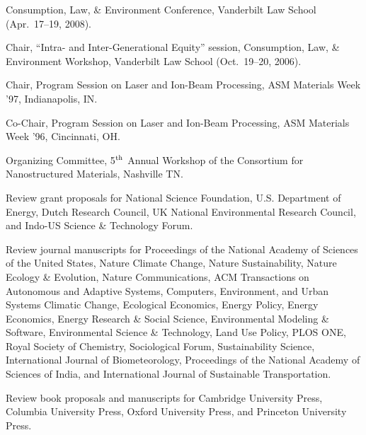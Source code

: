   Consumption, Law, \& Environment Conference, Vanderbilt Law School
  (Apr.\ 17--19, 2008).
\item[2006] Chair, ``Intra- and Inter-Generational Equity'' session,
  Consumption, Law, \& Environment Workshop, Vanderbilt Law School
  (Oct.~19--20, 2006).
\item[1997] Chair, Program Session on Laser and Ion-Beam Processing,
  ASM Materials Week '97, In\-di\-an\-a\-po\-lis, IN.
\item[1996] Co-Chair, Program Session on Laser and Ion-Beam Processing,
  ASM Materials Week '96, Cincinnati, OH.
\item[1996] Organizing Committee,
   5$^{\mbox{\scriptsize th}}$ Annual Workshop of the Consortium for
   Nanostructured Materials, Nashville TN.
\item[Ongoing] Review grant proposals for National Science Foundation,
  U.S. Department of Energy,
  Dutch Research Council,
  UK National Environmental Research Council,
  and Indo-US Science \& Technology Forum.
\item[Ongoing] Review journal manuscripts for
  Proceedings of the National Academy of Sciences of the United States,
  Nature Climate Change,
  Nature Sustainability,
  Nature Ecology \& Evolution,
  Nature Communications,
  ACM Transactions on Autonomous and Adaptive Systems,
  Computers, Environment, and Urban Systems
  Climatic Change,
  Ecological Economics,
  Energy Policy,
  Energy Economics,
  Energy Research \& Social Science,
  Environmental Modeling \& Software,
  Environmental Science \& Technology,
  Land Use Policy,
  PLOS ONE,
  Royal Society of Chemistry,
  Sociological Forum,
  Sustainability Science,
  International Journal of Biometeorology,
  Proceedings of the National Academy of Sciences of India,
  and
  International Journal of Sustainable Transportation.
\item[Ongoing] Review book proposals and manuscripts for
  Cambridge University Press,
  Columbia University Press,
  Oxford University Press,
  and Princeton University Press.

